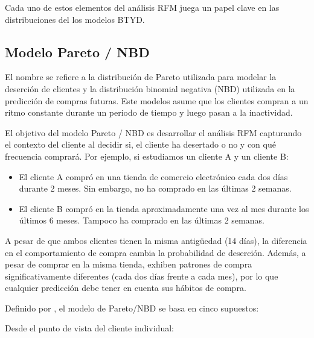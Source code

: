 Cada uno de estos elementos del análisis RFM juega un papel clave en las distribuciones del los modelos BTYD. 

\subsection{Modelo Pareto / NBD}

El nombre se refiere a la distribución de Pareto utilizada para modelar la deserción de clientes y la distribución binomial negativa (NBD) utilizada en la predicción de compras futuras. Este modelos asume que los clientes compran a un ritmo constante durante un periodo de tiempo y luego pasan a la inactividad.

	El objetivo del modelo Pareto / NBD es desarrollar el análisis RFM capturando el contexto del cliente al decidir si, el cliente ha desertado o no y con qué frecuencia comprará. Por ejemplo, si estudiamos un cliente A y un cliente B: 

\begin{itemize}
	\item El cliente A compró en una tienda de comercio electrónico cada dos días durante 2 meses. Sin embargo, no ha comprado en las últimas 2 semanas.
	\item El cliente B compró en la tienda aproximadamente una vez al mes durante los últimos 6 meses. Tampoco ha comprado en las últimas 2 semanas.
\end{itemize}

A pesar de que ambos clientes tienen la misma antigüedad (14 días), la diferencia en el comportamiento de compra cambia la probabilidad de deserción. Además, a pesar de comprar en la misma tienda, exhiben patrones de compra significativamente diferentes (cada dos días frente a cada mes), por lo que cualquier predicción debe tener en cuenta sus hábitos de compra.

Definido por \cite{schmittlein1987}, el modelo de Pareto/NBD se basa en cinco supuestos:

Desde el punto de vista del cliente individual:


